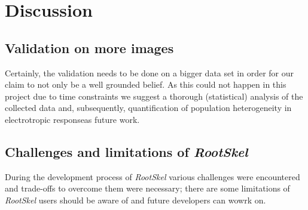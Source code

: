 
\chapter{Discussion} %

\label{discussion} %

%





\section{Validation on more images}

Certainly, the validation needs to be done on a bigger data set in order for our claim to not only be a well grounded belief.
As this could not happen in this project due to time constraints we suggest a thorough (statistical) analysis of the collected data and, subsequently, quantification of population heterogeneity in electrotropic responseas future work.


\section{Challenges and limitations of \textit{RootSkel}}

During the development process of \textit{RootSkel} various challenges were encountered and trade-offs to overcome them were necessary; there are some limitations of \textit{RootSkel} users should be aware of and future developers can wowrk on.


